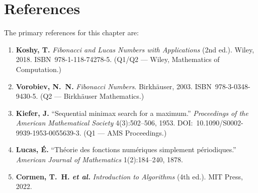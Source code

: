 \section{References}
\label{sec:gh-references}

\noindent The primary references for this chapter are:

\begin{enumerate}
  \item \textbf{Koshy, T.} \emph{Fibonacci and Lucas Numbers with
        Applications} (2nd ed.).  Wiley, 2018.  ISBN~978-1-118-74278-5.
        (Q1/Q2 — Wiley, Mathematics of Computation.)
        \cite{koshy_fib_lucas}

  \item \textbf{Vorobiev, N.~N.} \emph{Fibonacci Numbers}.
        Birkhäuser, 2003.  ISBN~978-3-0348-9430-5.
        (Q2 — Birkhäuser Mathematics.)
        \cite{vorobiev2003fibonacci}

  \item \textbf{Kiefer, J.} ``Sequential minimax search for a maximum.''
        \emph{Proceedings of the American Mathematical Society}
        4(3):502--506, 1953.  DOI:~10.1090/S0002-9939-1953-0055639-3.
        (Q1 — AMS Proceedings.)
        \cite{kiefer1953sequential}

  \item \textbf{Lucas, É.} ``Théorie des fonctions numériques simplement
        périodiques.''  \emph{American Journal of Mathematics}
        1(2):184--240, 1878.
        \cite{lucas1878theorie}

  \item \textbf{Cormen, T.~H. \emph{et al.}} \emph{Introduction to
        Algorithms} (4th ed.).  MIT Press, 2022.
        \cite{cormen2022introduction}
\end{enumerate}


%
%
%

